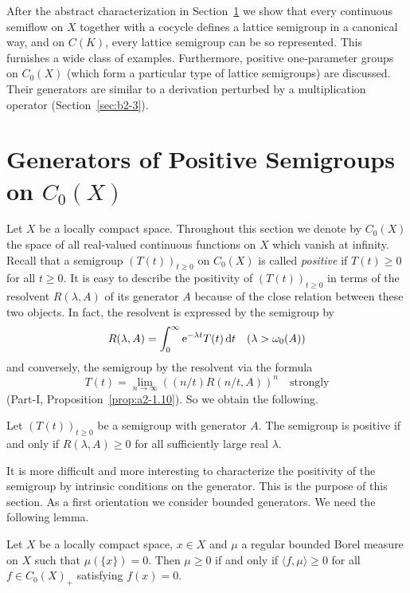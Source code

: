 After the abstract characterization in Section~\ref{sec:b2-1} we show that every continuous semiflow on $X$ together with a cocycle defines a lattice semigroup in a canonical way, and on $C(K)$, every lattice semigroup can be so represented.
This furnishes a wide class of examples.
Furthermore, positive one-parameter groups on $C_{0}(X)$ (which form a particular type of lattice semigroups) are discussed.
Their generators are similar to a derivation perturbed by a multiplication operator (Section~\ref{sec:b2-3}).

\section{Generators of Positive Semigroups on  \texorpdfstring{$C_{0}(X)$}{C₀(X)}} \label{sec:b2-1}%
Let $X$ be a locally compact space.
Throughout this section we denote by $C_{0}(X)$ the space of all real-valued continuous functions on $X$ which vanish at infinity.
Recall that a semigroup $(T(t))_{t \geq 0}$ on $C_{0}(X)$ is called \emph{positive} if\/ $T(t) \geq 0$ for all $t \geq 0$.
It is easy to describe the positivity of\/ $(T(t))_{t \geq 0}$ in terms of the resolvent $R(\lambda,A)$ of its generator $A$ because of the close relation between these two objects.
In fact, the resolvent is expressed by the semigroup by
\begin{equation}\label{eq:b2-1.1}
R(\lambda,A) = \int_{0}^{\infty} \mathrm{e}^{-\lambda t} T(t) \mathop{}\!\mathrm{d}{t} \quad (\lambda > \omega_{0}(A))
\end{equation}
and conversely, the semigroup by the resolvent via the formula
\begin{equation}\label{eq:b2-1.2}
T(t) = \lim_{n \to \infty} ((n/t)R(n/t,A))^{n} \quad \text{strongly}
\end{equation}
(\cf Part-I, Proposition~\ref{prop:a2-1.10}).
So we obtain the following.
\begin{proposition}\label{prop:b2-1.1}%
Let $(T(t))_{t \geq 0}$ be a semigroup with generator $A$.
The semigroup is positive if and only if\/ $R(\lambda,A) \geq 0$ for all sufficiently large real $\lambda$.
\end{proposition}
It is more difficult and more interesting to characterize the positivity of the semigroup by intrinsic conditions on the generator.
This is the purpose of this section.
As a first orientation we consider bounded generators.
We need the following lemma.
\begin{lemma}\label{lem:b2-1.2}
Let $X$ be a locally compact space, $x \in X$ and $\mu$ a regular bounded Borel measure on $X$ such that $\mu(\{x\}) = 0$.
Then $\mu \geq 0$ if and only if\/ $\langle f,\mu \rangle \geq 0$ for all $f \in C_{0}(X)_{+}$ satisfying $f(x) = 0$.
\end{lemma}
